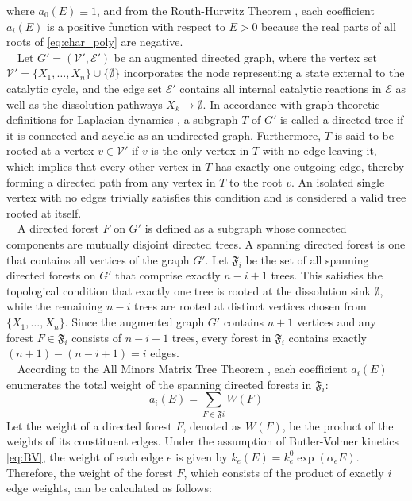\documentclass[11pt,a4paper]{article}
\begin{document}
where $a_0(E) \equiv 1$, and from the Routh-Hurwitz Theorem \cite{Hassan-2002}, each coefficient $a_i(E)$ is a positive function with respect to $E > 0$ because the real parts of all roots of \eqref{eq:char_poly} are negative.\\
~~Let $G' = (\mathcal{V}', \mathcal{E}')$ be an augmented directed graph, where the vertex set $\mathcal{V}' = \{X_1, \dots, X_n\} \cup \{\emptyset\}$ incorporates the node representing a state external to the catalytic cycle, and the edge set $\mathcal{E}'$ contains all internal catalytic reactions in $\mathcal{E}$ as well as the dissolution pathways $X_k \to \emptyset$. In accordance with graph-theoretic definitions for Laplacian dynamics \cite{Mirzaev-2013,Mirzaev-2015}, a subgraph $T$ of $G'$ is called a directed tree if it is connected and acyclic as an undirected graph. Furthermore, $T$ is said to be rooted at a vertex $v \in \mathcal{V}'$ if $v$ is the only vertex in $T$ with no edge leaving it, which implies that every other vertex in $T$ has exactly one outgoing edge, thereby forming a directed path from any vertex in $T$ to the root $v$. An isolated single vertex with no edges trivially satisfies this condition and is considered a valid tree rooted at itself.\\
~~A directed forest $F$ on $G'$ is defined as a subgraph whose connected components are mutually disjoint directed trees. A spanning directed forest is one that contains all vertices of the graph $G'$. Let $\mathfrak{F}_i$ be the set of all spanning directed forests on $G'$ that comprise exactly $n-i+1$ trees. This satisfies the topological condition that exactly one tree is rooted at the dissolution sink $\emptyset$, while the remaining $n-i$ trees are rooted at distinct vertices chosen from $\{X_1, \dots, X_n\}$. Since the augmented graph $G'$ contains $n+1$ vertices and any forest $F \in \mathfrak{F}_i$ consists of $n-i+1$ trees, every forest in $\mathfrak{F}_i$ contains exactly $(n+1) - (n-i+1) = i$ edges.\\
~~According to the All Minors Matrix Tree Theorem \cite{Chaiken1982}, each coefficient $a_i(E)$ enumerates the total weight of the spanning directed forests in $\mathfrak{F}_i$:
\begin{equation}
a_i(E) = \sum_{F \in \mathfrak{F}i} W(F) \label{eq:tree_theorem}
\end{equation}
Let the weight of a directed forest $F$, denoted as $W(F)$, be the product of the weights of its constituent edges. Under the assumption of Butler-Volmer kinetics \eqref{eq:BV}, the weight of each edge $e$ is given by $k_e(E) = k_e^0 \exp(\alpha_e E)$. Therefore, the weight of the forest $F$, which consists of the product of exactly $i$ edge weights, can be calculated as follows:
\end{document}
